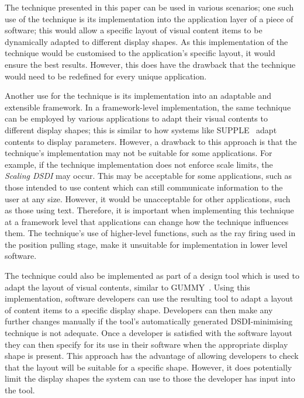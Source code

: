 \documentclass[twocolumn,compsoc]{cvm}
\begin{document}
{The technique presented in this paper can be used in various scenarios; one such use of the technique is its implementation into the application layer of a piece of software; this would allow a specific layout of visual content items to be dynamically adapted to different display shapes.
As this implementation of the technique would be customised to the application's specific layout, it would ensure the best results.
However, this does have the drawback that the technique would need to be redefined for every unique application.

Another use for the technique is its implementation into an adaptable and extensible framework.
In a framework-level implementation, the same technique can be
employed by various applications to adapt their visual contents to different display shapes; this is similar to how systems like SUPPLE~\cite{Gajos2004} adapt contents to display parameters.
However, a drawback to this approach is that the technique's implementation may not be suitable for some applications.  
For example, if the technique implementation does not enforce scale limits, the {\emph{Scaling \ac{DSDI}}} may occur.
This may be acceptable for some applications, such as those intended to use content which can still communicate information to the user at any size.
However, it would be unacceptable for other applications, such as those using text.
Therefore, it is important when implementing this technique at a framework level that applications can change how the technique influences them.
The technique's use of higher-level functions, such as the ray firing used in the position pulling stage, make it unsuitable for implementation in lower level software.

The technique could also be implemented as part of a design tool which is used to adapt the layout of visual contents, similar to GUMMY~\cite{Meskens2008}.
Using this implementation, software developers can use the resulting tool to adapt a layout of content items to a specific display shape.
Developers can then make any further changes manually if the tool's automatically generated \ac{DSDI}-minimising technique is not adequate.
Once a developer is satisfied with the software layout they can then specify for its use in their software when the appropriate display shape is present.
This approach has the advantage of allowing developers to check that the layout will be suitable for a specific shape.
However, it does potentially limit the display shapes the system can use to those the developer has input into the tool.

}
\end{document}
